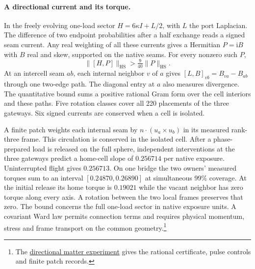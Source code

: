 \documentclass[11pt]{article}
\begin{document}
\paragraph{A directional current and its torque.}
In the freely evolving one-load sector $H=6\kappa I+L/2$, with $L$ the
port Laplacian. The difference of two endpoint probabilities after a half
exchange reads a signed seam current. Any real weighting of all these
currents gives a Hermitian $P=\mathrm i B$ with $B$ real and skew,
supported on the native seams. For every nonzero such $P$,
\[
   \|[H,P]\|_{\mathrm{HS}}>\tfrac{9}{40}\|P\|_{\mathrm{HS}} .
\]
At an intercell seam $ab$, each internal neighbor $v$ of $a$ gives
$[L,B]_{vb}=B_{va}-B_{ab}$ through one two-edge path.
The diagonal entry at $a$ also measures divergence. The quantitative
bound sums a positive rational Gram form over the cell interiors and
these paths. Five rotation classes cover all 220 placements of the three
gateways. Six signed currents are conserved when a cell is isolated.

A finite patch weights each internal seam by
$n\cdot(u_a\times u_b)$ in its measured rank-three frame. This
circulation is conserved in the isolated cell. After a phase-prepared
load is released on the full sphere, independent interventions at the
three gateways predict a home-cell slope of $0.256714$ per native
exposure. Uninterrupted flight gives $0.256713$. On one bridge the two
owners' measured torques sum to an interval $[0.24870,0.26890]$ at
simultaneous 99\% coverage. At the initial release its home torque is
$0.19021$ while the vacant neighbor has zero torque along every axis.
A rotation between the two local frames preserves that zero. The bound concerns the full one-load sector in native exposure
units. A covariant Ward law permits connection terms and requires physical
momentum, stress and frame transport on the common geometry.\footnote{The
\href{https://github.com/FloatingPragma/observer-patch-holography/tree/main/model/experiments/interval_echo_null_balance}{directional matter experiment}
gives the rational certificate, pulse controls and finite patch records.}
\end{document}
